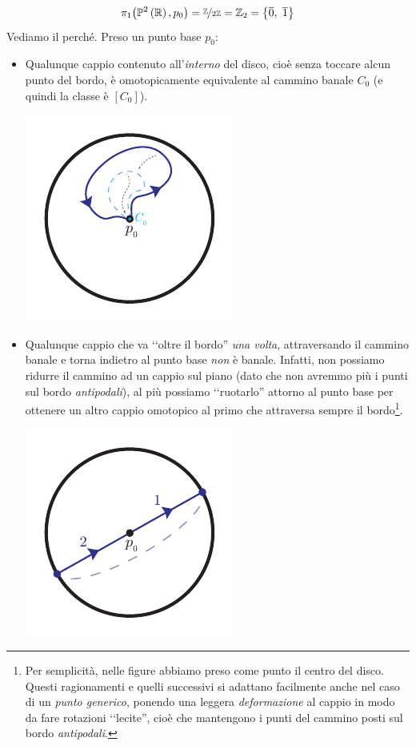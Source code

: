 \begin{itemize}
\begin{equation*}
			\homotopy[1]{\Proj^2\left(\R\right),p_0}=\nicefrac{\Z}{2\Z}=\Z_2=\left\{\overline{0},\ \overline{1}\right\}
		\end{equation*}
	Vediamo il perché. Preso un punto base $p_0$:
		\begin{itemize}
				\item Qualunque cappio contenuto all'\textit{interno} del disco, cioè senza toccare alcun punto del bordo, è omotopicamente equivalente al cammino banale $C_0$ (e quindi la classe è $\left[C_0\right]$).
			\begin{center}
				\includegraphics[trim=0cm 0cm 0cm 0cm,clip,scale=0.95]{images/projdiscindisc.pdf}
			\end{center}
			\item Qualunque cappio che va ‘‘oltre il bordo'' \textit{una volta}, attraversando il cammino banale e torna indietro al punto base \textit{non} è banale. Infatti, non possiamo ridurre il cammino ad un cappio sul piano (dato che non avremmo più i punti sul bordo \textit{antipodali}), al più possiamo ‘‘ruotarlo'' attorno al punto base per ottenere un altro cappio omotopico al primo che attraversa sempre il bordo\footnote{Per semplicità, nelle figure abbiamo preso come punto il centro del disco. Questi ragionamenti e quelli successivi si adattano facilmente anche nel caso di un \textit{punto generico}, ponendo una leggera \textit{deformazione} al cappio in modo da fare rotazioni ‘‘lecite'', cioè che mantengono i punti del cammino posti sul bordo \textit{antipodali}.}.
						\begin{center}
				\includegraphics[trim=0cm 0cm 0cm 0cm,clip,scale=0.95]{images/projdiscoverborder1.pdf}

\end{center}
\end{itemize}
\end{itemize}
